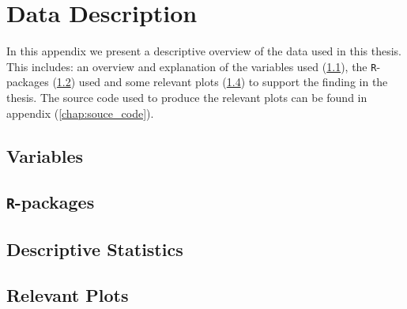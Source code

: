 \documentclass[../thesis.tex]{subfiles}
\begin{document}
\appendix

\chapter{Data Description}
\label{chap:data_desc}

\noindent In this appendix we present a descriptive overview of the data used in this thesis. This includes: an overview and explanation of the variables used (\ref{sec:variables}), the \texttt{R}-packages (\ref{sec:r_pack}) used and some relevant plots (\ref{sec:rel_plots}) to support the finding in the thesis. The source code used to produce the relevant plots can be found in appendix (\ref{chap:souce_code}).  

\section{Variables}
\label{sec:variables}

\section{\texttt{R}-packages}
\label{sec:r_pack}

\section{Descriptive Statistics}
\label{sec:desc_stat}





\newpage

\section{Relevant Plots}
\label{sec:rel_plots}
\end{document}
